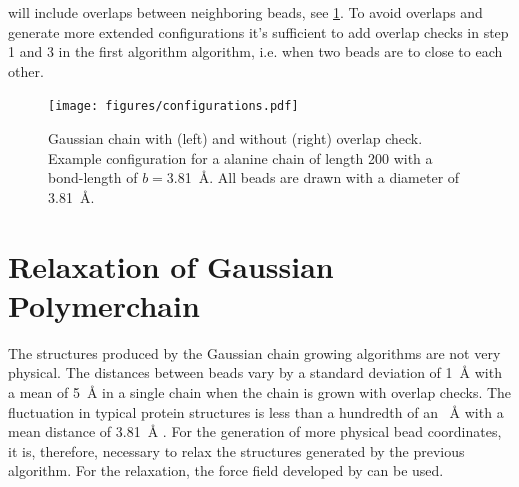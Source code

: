 \documentclass[12pt, twoside]{report}
\begin{document}
will include overlaps between neighboring beads, see \cref{fig:configuration}.
To avoid overlaps and generate more extended configurations it's sufficient to
add overlap checks in step 1 and 3 in the first algorithm algorithm, i.e. when
two beads are to close to each other.
\begin{figure}[!ht] \centering
\texttt{[image: figures/configurations.pdf]}
\caption[Example configuration generated for a Gaussian chain polymer model.]{
Gaussian chain with (left) and without (right) overlap check. Example
configuration for a alanine chain of length 200 with a bond-length of
$b=$\SI{3.81}{\AA}. All beads are drawn with a diameter of \SI{3.81}{\AA}.}
\label{fig:configuration}
\end{figure}

\section{Relaxation of Gaussian Polymerchain} The structures produced by
the Gaussian chain growing algorithms are not very physical. The distances
between beads vary by a standard deviation of \SI{1}{\AA} with a mean of
\SI{5}{\AA} in a single chain when the chain is grown with overlap checks. The
fluctuation in typical protein structures is less than a hundredth of an
\SI{}{\angstrom} with a mean distance of \SI{3.81}{\AA} \cite{Best2005}. For the
generation of more physical bead coordinates, it is, therefore, necessary to
relax the structures generated by the previous algorithm. For the relaxation,
the force field developed by \citet{Kim2008} can be used.
\end{document}
